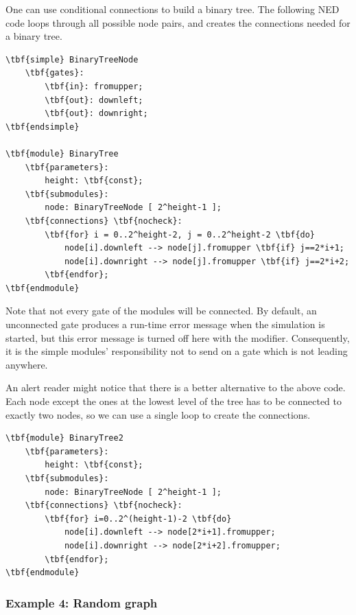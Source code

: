 One can use conditional connections to build a binary tree.
The following NED code loops through all possible node pairs, and
creates the connections needed for a binary tree.

\begin{Verbatim}[commandchars=\\\{\}]
\tbf{simple} BinaryTreeNode
    \tbf{gates}:
        \tbf{in}: fromupper;
        \tbf{out}: downleft;
        \tbf{out}: downright;
\tbf{endsimple}

\tbf{module} BinaryTree
    \tbf{parameters}:
        height: \tbf{const};
    \tbf{submodules}:
        node: BinaryTreeNode [ 2^height-1 ];
    \tbf{connections} \tbf{nocheck}:
        \tbf{for} i = 0..2^height-2, j = 0..2^height-2 \tbf{do}
            node[i].downleft --> node[j].fromupper \tbf{if} j==2*i+1;
            node[i].downright --> node[j].fromupper \tbf{if} j==2*i+2;
        \tbf{endfor};
\tbf{endmodule}
\end{Verbatim}

Note that not every gate of the modules will be connected. By default,
an unconnected gate produces a run-time error message when the
simulation is started, but this error message is turned off here with
the  modifier.  Consequently, it
is the simple modules' responsibility not to send on a gate which is
not leading anywhere.

An alert reader might notice that there is a better alternative
to the above code. Each node except the ones at the lowest level
of the tree has to be connected to exactly two nodes,
so we can use a single loop to create the connections.

\begin{Verbatim}[commandchars=\\\{\}]
\tbf{module} BinaryTree2
    \tbf{parameters}:
        height: \tbf{const};
    \tbf{submodules}:
        node: BinaryTreeNode [ 2^height-1 ];
    \tbf{connections} \tbf{nocheck}:
        \tbf{for} i=0..2^(height-1)-2 \tbf{do}
            node[i].downleft --> node[2*i+1].fromupper;
            node[i].downright --> node[2*i+2].fromupper;
        \tbf{endfor};
\tbf{endmodule}
\end{Verbatim}



\subsubsection{Example 4: Random graph}

